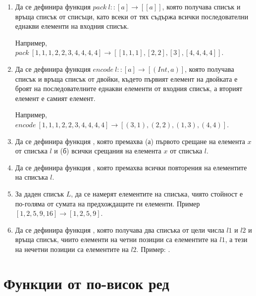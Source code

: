 \begin{enumerate}[resume]
	\item Да се дефинира функция $pack \: l :: [a] \rightarrow [[a]]$, която получава списък и връща списък от списъци, като всеки от тях съдържа всички последователни еднакви елементи на входния списък.
	
	Например, $pack \: [1,1,1,2,2,3,4,4,4,4] \rightarrow [[1,1,1],[2,2],[3],[4,4,4,4]]$.

	\item Да се дефинира функция $encode \: l :: [a] \rightarrow [(Int,a)]$, която получава списък и връща списък от двойки, където първият елемент на двойката е броят на последователните еднакви елементи от входния списък, а вторият елемент е самият елемент.
	
	Например, $encode \: [1,1,1,2,2,3,4,4,4,4] \rightarrow [(3,1),(2,2),(1,3),(4,4)]$.

	\item Да се дефинира функция , която премахва (а) първото срещане на елемента $x$ от списъка $l$ и (б) всички срещания на елемента $x$ от списъка $l$.
		
	\item Да се дефинира функция , която премахва всички повторения на елементите на списъка $l$.
	
	\item За даден списък $L$, да се намерят елементите на списъка, чиято стойност е по-голяма от сумата на предхождащите ги елементи. Пример $[1,2,5,9,16] \rightarrow [1,2,5,9]$.
	
	\item Да се дефинира функция , която получава два списъка от цели числа $l1$ и $l2$ и връща списък, чиито елементи на четни позиции са елементите на $l1$, а тези на нечетни позиции са елементите на $l2$. Пример: .


\end{enumerate}

\section {Функции от по-висок ред}

